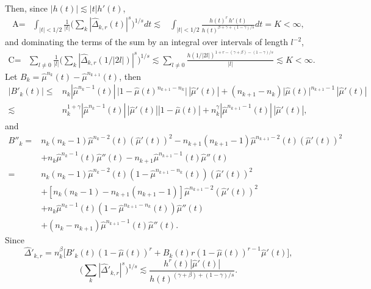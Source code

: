 \documentclass[11pt]{amsart}
\theoremstyle{definition}
\theoremstyle{remark}
\begin{document}
\noindent Then, since $|h(t)|\lesssim |t| h'(t)$,
\begin{align*}
 \mbox{A} = &
\int_{|t|<1/2} \frac 1{|t|} \Big( \sum_k  |\hat\Delta_{k,r}(t)|^{s}  \Big)^{1/s}  dt
\lesssim & \int_{|t|<1/2}  \frac{h(t)^{r} \, h'(t)}{ h(t)^{\beta+\gamma+(1-\gamma)/s}}  dt =K <\infty,
  \end{align*}
and dominating the terms of the sum by an integral over intervals of length $l^{-2}$,
\begin{align*}
\mbox{C} =&  \sum_{l\neq 0} \frac 1{|l|}
\Big(    \sum_k |\hat\Delta_{k,r}(1/|2l| )|^s  \Big)^{1/s} 
\lesssim    \sum_{l\neq 0} \frac {h(1/|2l|)^{1+r-(\gamma+\beta)-(1-\gamma)/s}}{|l|} \lesssim K <\infty. 
\end{align*}
%
%
%
Let $B_k=\hat\mu^{n_k}(t)-  \hat\mu^{n_{k+1}}(t)$, then
\begin{align*}
| B'_k(t) |
\le &
 n_k | \hat \mu^{n_k-1}(t)| \,  
\Big| 1-\hat\mu(t)^{n_{k+1}-n_k} \Big| \,|\hat\mu'(t) | 
 +  (n_{k+1}-n_k)  \Big| \hat\mu(t) \Big|^{n_{k+1}-1}  \, |\hat\mu'(t)|\\
 \lesssim & n_k^{1+\gamma} | \hat \mu^{n_k-1}(t)| \, |\hat\mu'(t)| |1-\hat\mu(t)| 
 + n_k^{\gamma} | \hat \mu^{n_{k+1}-1}(t)| \, |\hat\mu'(t)|,
 \end{align*}
 and
\begin{align*}
 B''_k
  = &  n_k(n_k-1) \hat\mu^{n_k-2}(t) (\hat \mu'(t))^2 - n_{k+1}(n_{k+1}-1) 
         \hat\mu^{n_{k+1}-2}(t)(\hat \mu'(t))^2  \nonumber \\
 & +n_k \hat\mu^{n_k-1}(t) \hat \mu''(t) - n_{k+1} \hat\mu^{n_{k+1}-1}(t) \hat \mu''(t)  \\ %
= & n_k(n_k-1)\hat\mu^{n_k-2}(t) (1-\hat\mu^{n_{k+1}-n_k}(t)) (\hat \mu'(t))^2 \nonumber\\
& +[n_k(n_k-1)-n_{k+1} (n_{k+1}-1)] \hat\mu^{n_{k+1}-2} (\hat \mu'(t))^2 \nonumber\\
& +  n_k  \hat\mu^{n_k-1}(t) (1-\hat\mu^{n_{k+1}-n_k}(t)) \hat \mu''(t) \nonumber\\
& +(n_k-n_{k+1}) \hat\mu^{n_{k+1}-1}(t) \hat \mu''(t).\nonumber
\end{align*}
Since
\[ \hat\Delta'_{k,r} = n_k^{\beta} \big[ B'_k(t) (1-\hat\mu(t))^r + B_k(t) r (1-\hat\mu(t))^{r-1} \hat\mu'(t)\big],\]
 \begin{equation} \Big( \sum_k  |\hat\Delta'_{k,r}|^s \Big)^{1/s}
 \lesssim  \frac {h^r(t) |\hat\mu'(t)| }{h(t)^{(\gamma+\beta)+(1-\gamma)/s }}. \label{eq:nkprime} %
 \end{equation}
\end{document}
